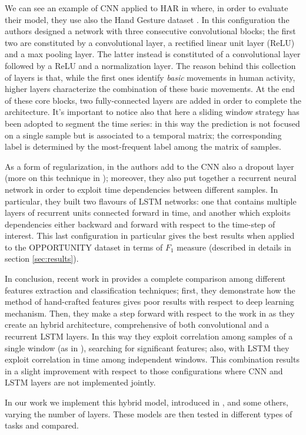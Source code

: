We can see an example of CNN applied to HAR in \cite{yang2015deep} where, in order to evaluate their model, they use also the Hand Gesture dataset \cite{bulling2014tutorial}. In this configuration the authors designed a network with three consecutive convolutional blocks; the first two are constituted by a convolutional layer, a rectified linear unit layer (ReLU) and a max pooling layer. The latter instead is constituted of a convolutional layer followed by a ReLU and a normalization layer. The reason behind this collection of layers is that, while the first ones identify \textit{basic} movements in human activity, higher layers characterize the combination of these basic movements. At the end of these core blocks, two fully-connected layers are added in order to complete the architecture. It's important to notice also that here a sliding window strategy has been adopted to segment the time series: in this way the prediction is not focused on a single sample but is associated to a temporal matrix; the corresponding label is determined by the most-frequent label among the matrix of samples.

As a form of regularization, in \cite{hammerla2016deep} the authors add to the CNN also a dropout layer (more on this technique in \cite{srivastava2014dropout}); moreover, they also put together a recurrent neural network in order to exploit time dependencies between different samples. In particular, they built two flavours of LSTM networks: one that contains multiple layers of recurrent units connected forward in time, and another which exploits dependencies either backward and forward with respect to the time-step of interest. This last configuration in particular gives the best results when applied to the OPPORTUNITY dataset in terms of $F_1$ measure (described in details in section \ref{sec:results}).

In conclusion, recent work in \cite{li2018comparison} provides a complete comparison among different features extraction and classification techniques; first, they demonstrate how the method of hand-crafted features gives poor results with respect to deep learning mechanism. Then, they make a step forward with respect to the work in \cite{hammerla2016deep} as they create an hybrid architecture, comprehensive of both convolutional and a recurrent LSTM layers. In this way they exploit correlation among samples of a single window (as in \cite{yang2015deep}), searching for significant features; also, with LSTM they exploit correlation in time among independent windows. This combination results in a slight improvement with respect to those configurations where CNN and LSTM layers are not implemented jointly.

In our work we implement this hybrid model, introduced in \cite{li2018comparison} , and some others, varying the number of layers. These models are then tested in different types of tasks and compared.
